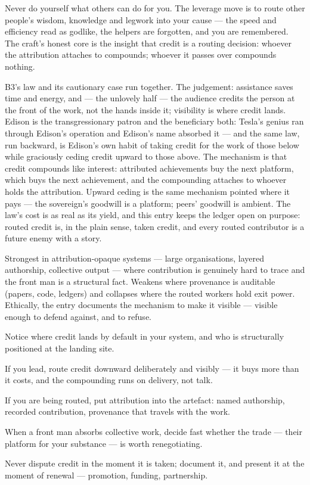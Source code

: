 \begin{core}
Never do yourself what others can do for you. The leverage move is to route other people's wisdom, knowledge and legwork into your cause --- the speed and efficiency read as godlike, the helpers are forgotten, and you are remembered. The craft's honest core is the insight that credit is a routing decision: whoever the attribution attaches to compounds; whoever it passes over compounds nothing.
\end{core}
\begin{mechanism}
B3's law and its cautionary case run together. The judgement: assistance saves time and energy, and --- the unlovely half --- the audience credits the person at the front of the work, not the hands inside it; visibility is where credit lands. Edison is the transgressionary patron and the beneficiary both: Tesla's genius ran through Edison's operation and Edison's name absorbed it --- and the same law, run backward, is Edison's own habit of taking credit for the work of those below while graciously ceding credit upward to those above. The mechanism is that credit compounds like interest: attributed achievements buy the next platform, which buys the next achievement, and the compounding attaches to whoever holds the attribution. Upward ceding is the same mechanism pointed where it pays --- the sovereign's goodwill is a platform; peers' goodwill is ambient. The law's cost is as real as its yield, and this entry keeps the ledger open on purpose: routed credit is, in the plain sense, taken credit, and every routed contributor is a future enemy with a story.
\end{mechanism}
\begin{conditions}
Strongest in attribution-opaque systems --- large organisations, layered authorship, collective output --- where contribution is genuinely hard to trace and the front man is a structural fact. Weakens where provenance is auditable (papers, code, ledgers) and collapses where the routed workers hold exit power. Ethically, the entry documents the mechanism to make it visible --- visible enough to defend against, and to refuse.
\end{conditions}
\begin{application}
  \item Notice where credit lands by default in your system, and who is structurally positioned at the landing site.
  \item If you lead, route credit downward deliberately and visibly --- it buys more than it costs, and the compounding runs on delivery, not talk.
  \item If you are being routed, put attribution into the artefact: named authorship, recorded contribution, provenance that travels with the work.
  \item When a front man absorbs collective work, decide fast whether the trade --- their platform for your substance --- is worth renegotiating.
  \item Never dispute credit in the moment it is taken; document it, and present it at the moment of renewal --- promotion, funding, partnership.
\end{application}
